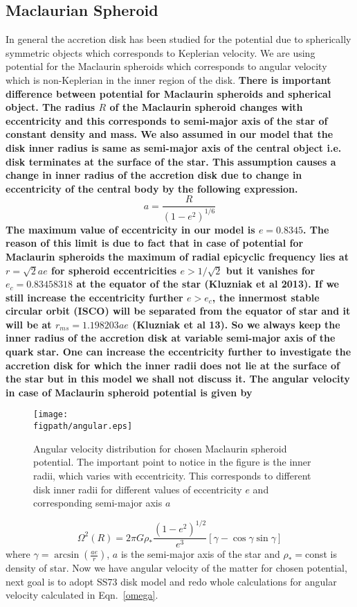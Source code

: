 \documentclass[useAMS,usenatbib]{mn2e}
\newcommand{\figpath}{./Figs/}
\begin{document}
\subsection{Maclaurian Spheroid}
In general the accretion disk has been studied for the potential due to spherically symmetric objects which corresponds to Keplerian velocity. We are using potential for the Maclaurin spheroids which corresponds to angular velocity which is non-Keplerian in the inner region of the disk. \textbf{There is important difference between potential for Maclaurin spheroids and spherical object. The radius $R$ of the Maclaurin spheroid changes with eccentricity and this corresponds to semi-major axis of the star of constant density and mass. We also assumed in our model that the disk inner radius is same as semi-major axis of the central object i.e. disk terminates at the surface of the star. This assumption causes a change in inner radius of the accretion disk due to change in eccentricity of the central body by the following expression.
\begin{equation}
a = \frac{R}{(1 - e^2)^{1/6}}
\end{equation}
The maximum value of eccentricity in our model is $e = 0.8345$. The reason of this limit is due to fact that in case of potential for Maclaurin spheroids the maximum of radial epicyclic frequency lies at $r = \sqrt{2}ae$ for spheroid eccentricities $e>1/\sqrt{2}$ but it vanishes for $e_c = 0.83458318$ at the equator of the star (Kluzniak et al 2013). If we still increase the eccentricity further $e>e_c$, the innermost stable circular orbit (ISCO) will be separated from the equator of star and it will be at $r_{ms} = 1.198203ae$ (Kluzniak et al 13). So we always keep the inner radius of the accretion disk at variable semi-major axis of the quark star. One can increase the eccentricity further to investigate the accretion disk for which the inner radii does not lie at the surface of the star but in this model we shall not discuss it. The angular velocity in case of Maclaurin spheroid potential is given by}
\begin{figure}
\centering
\texttt{[image: \\figpath/angular.eps]}
\caption{Angular velocity distribution for chosen Maclaurin spheroid potential. The important point to notice in the figure is the inner radii, which varies with eccentricity. This corresponds to different disk inner radii for different values of eccentricity $e$ and corresponding semi-major axis $a$}
\label{angular}
\end{figure}
\begin{equation}
\Omega ^2 \left(R\right)= 2\pi G\rho_* \frac{(1-e^2)^{1/2}}{e^3}\left[\gamma - \cos \gamma \sin\gamma \right]
\label{omega}
\end{equation}  
where $\gamma = \arcsin (\frac{a e}{r})$, $a$ is the semi-major axis of the star and $\rho_* =$const is density of star. Now we have angular velocity of the matter for chosen potential, next goal is to adopt SS73 disk model and redo whole calculations for angular velocity calculated in Eqn.~\ref{omega}.
\end{document}
